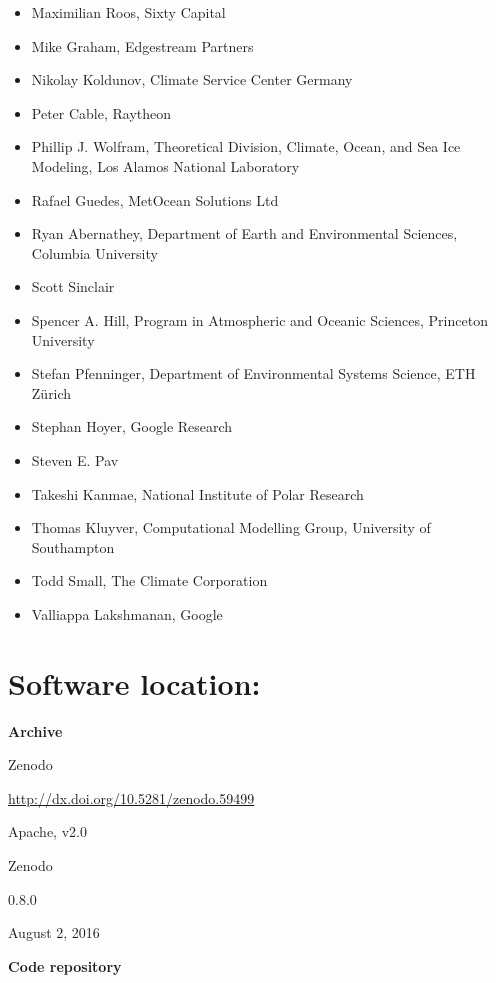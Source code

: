 \documentclass{jors}
\begin{document}
\begin{itemize}
\item Maximilian Roos, Sixty Capital
\item Mike Graham, Edgestream Partners
\item Nikolay Koldunov, Climate Service Center Germany
\item Peter Cable, Raytheon
\item Phillip J. Wolfram, Theoretical Division, Climate, Ocean, and Sea Ice Modeling, Los Alamos National Laboratory
\item Rafael Guedes, MetOcean Solutions Ltd
\item Ryan Abernathey, Department of Earth and Environmental Sciences, Columbia University
\item Scott Sinclair
\item Spencer A. Hill, Program in Atmospheric and Oceanic Sciences, Princeton University
\item Stefan Pfenninger, Department of Environmental Systems Science, ETH Zürich
\item Stephan Hoyer, Google Research
\item Steven E. Pav
\item Takeshi Kanmae, National Institute of Polar Research
\item Thomas Kluyver, Computational Modelling Group, University of Southampton
\item Todd Small, The Climate Corporation
\item Valliappa Lakshmanan, Google
\end{itemize}

\section*{Software location:}

{\bf Archive}

\begin{description}[noitemsep,topsep=0pt]
	\item[Name:] Zenodo
	\item[Persistent identifier:] \url{http://dx.doi.org/10.5281/zenodo.59499}
	\item[Licence:] Apache, v2.0
	\item[Publisher:]  Zenodo
	\item[Version published:] 0.8.0
	\item[Date published:] August 2, 2016
\end{description}

{\bf Code repository}
\end{document}
